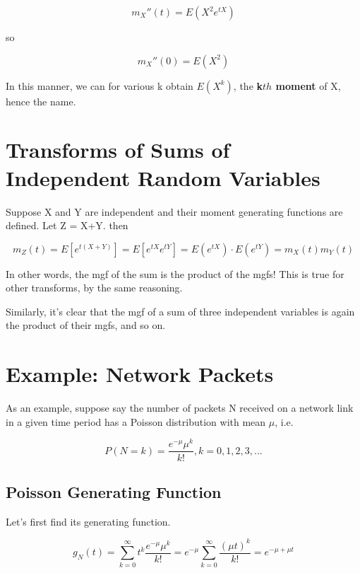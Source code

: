 \begin{equation}
m_X''(t) = E(X^2 e^{tX})
\end{equation}

so

\begin{equation}
m_X''(0) = E(X^2)
\end{equation}

In this manner, we can for various k obtain $E(X^k)$, the {\bf k$th$
moment} of X, hence the name.

\section{Transforms of Sums of Independent Random Variables}
\label{tranfssums}

Suppose X and Y are independent and their moment generating functions
are defined.  Let Z = X+Y.  then

\begin{equation}
m_Z(t) = E[e^{t(X+Y)}] = E[e^{tX} e^{tY}] = E(e^{tX}) \cdot E(e^{tY}) =
m_X(t) m_Y(t)
\end{equation}

In other words, the mgf of the sum is the product of the mgfs!  This is
true for other transforms, by the same reasoning.

Similarly, it's clear that the mgf of a sum of three independent
variables is again the product of their mgfs, and so on.

\section{Example:  Network Packets}

As an example, suppose say the number of packets N received on a network
link in a given time period has a Poisson distribution with mean $\mu$,
i.e.

\begin{equation}
P(N = k) = \frac{e^{-\mu} \mu^k}{k!}, k = 0,1,2,3,...  
\end{equation}

\subsection{Poisson Generating Function}

Let's first find its generating function.

\begin{equation}
g_N(t) = \sum_{k=0}^{\infty} t^k  \frac{e^{-\mu} \mu^k}{k!} 
= e^{-\mu} \sum_{k=0}^{\infty} \frac{(\mu t)^k}{k!}
= e^{-\mu+\mu t}
\end{equation}

